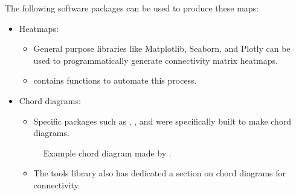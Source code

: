 \documentclass[letterpaper,10pt,english]{jupyterBook}
\begin{document}
\sphinxAtStartPar
The following software packages can be used to produce these maps:
\begin{itemize}
\item {} 
\sphinxAtStartPar
Heatmaps:
\begin{itemize}
\item {} 
\sphinxAtStartPar
General purpose libraries like Matplotlib, Seaborn, and Plotly can be used to programmatically generate connectivity matrix heatmaps.

\item {} 
\sphinxAtStartPar
{} contains functions to automate this process.

\end{itemize}

\item {} 
\sphinxAtStartPar
Chord diagrams:
\begin{itemize}
\item {} 
\sphinxAtStartPar
Specific packages such as , , and  were specifically built to make chord diagrams.

\end{itemize}

\begin{figure}[htbp]
\centering
\capstart

\noindent{}
\caption{Example chord diagram made by .}\label{\detokenize{chapters/03/03b_visualization-tools:pycircos}}\end{figure}
\begin{itemize}
\item {} 
\sphinxAtStartPar
The  tools library also has dedicated a section on chord diagrams for connectivity.

\end{itemize}

\begin{figure}[htbp]
\centering
\capstart


\end{figure}
\end{itemize}
\end{document}
